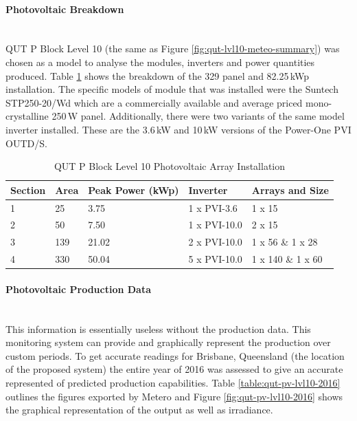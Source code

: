 \paragraph{Photovoltaic Breakdown}
~\\
QUT P Block Level 10 (the same as Figure \ref{fig:qut-lvl10-meteo-summary}) was chosen as a model to analyse the modules, inverters and power quantities produced. Table \ref{table:qut-pblock-lvl10-pv-breakdown} shows the breakdown of the 329 panel and 82.25\,kWp installation. The specific models of module that was installed were the Suntech STP250-20/Wd which are a commercially available and average priced mono-crystalline 250\,W panel. Additionally, there were two variants of the same model inverter installed. These are the 3.6\,kW and 10\,kW versions of the Power-One PVI OUTD/S.        

\begin{table}[H]
	\centering
	\begin{tabular}{|l|l|l|l|l|}
		\hline
		\textbf{Section} & \textbf{Area} & \textbf{Peak Power (kWp)} & \textbf{Inverter} & \textbf{Arrays and Size} \\ \hline
		1                & 25                                  & 3.75                      & 1 x PVI-3.6       & 1 x 15                   \\ \hline
		2                & 50                                  & 7.50                      & 1 x PVI-10.0      & 2 x 15                   \\ \hline
		3                & 139                                 & 21.02                     & 2 x PVI-10.0      & 1 x 56 \& 1 x 28         \\ \hline
		4                & 330                                 & 50.04                     & 5 x PVI-10.0      & 1 x 140 \& 1 x 60        \\ \hline
	\end{tabular}
\caption{QUT P Block Level 10 Photovoltaic Array Installation}
\label{table:qut-pblock-lvl10-pv-breakdown}
\end{table}

\paragraph{Photovoltaic Production Data}
~\\
This information is essentially useless without the production data. This monitoring system can provide and graphically represent the production over custom periods. To get accurate readings for Brisbane, Queensland (the location of the proposed system) the entire year of 2016 was assessed to give an accurate represented of predicted production capabilities. Table \ref{table:qut-pv-lvl10-2016} outlines the figures exported by Metero and Figure \ref{fig:qut-pv-lvl10-2016} shows the graphical representation of the output as well as irradiance.  

